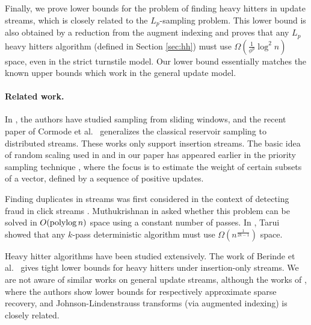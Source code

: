 
Finally, we prove lower bounds for the problem of finding heavy hitters in update streams, 
which is closely related to the $L_p$-sampling problem. This lower bound is also obtained 
by a reduction from the augment indexing and proves that any $L_p$ heavy 
hitters algorithm (defined in Section \ref{sec:hh}) must use 
$\Omega(\frac{1}{\phi^p}\log^2 n)$ space, even in the strict turnstile model. 
Our lower bound essentially matches the known upper bounds \cite{CormodeM05,CharikarCF04,KaneNPW} which work in the general update model. 

\paragraph{Related work.} In \cite{BabcockDM02,BravermanOZ09}, the authors have 
studied sampling from sliding windows, and the recent paper
of Cormode et al.\ \cite{CormodeMYZ10} generalizes the classical reservoir sampling 
to distributed streams. These works only support insertion streams.
 The basic idea of random scaling used in \cite{AndoniKO10} and in our paper has appeared earlier in
 the priority sampling technique \cite{DuffieldLT07,CohenDKLT09}, where the focus is
 to estimate the weight of certain subsets of a vector, defined by a sequence of positive updates.
 
Finding duplicates in streams was first considered 
in the context of detecting fraud in click streams \cite{MetwallyAA05}. 
Muthukrishnan in \cite{Muthukrishnan}
asked whether this problem can be solved in 
$O(\operatorname{polylog} n)$ space using a constant number of passes. In \cite{Tarui}, Tarui showed
that any $k$-pass deterministic algorithm must use $\Omega(n^{\frac1{2k-1}})$
space. 
 
Heavy hitter algorithms have been studied extensively. 
The work of Berinde et al.\
\cite{BerindeCIS09} gives tight lower bounds for heavy hitters under 
 insertion-only streams. We are not aware of similar works on
general update streams, although the works of \cite{BaIPW10, WoodruffJ11},
 where the authors show lower bounds for respectively approximate
sparse recovery, and Johnson-Lindenstrauss transforms (via augmented indexing) is closely related.    
    

